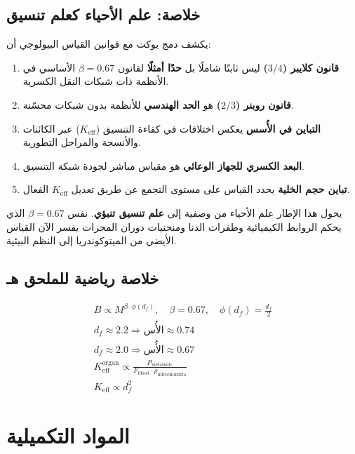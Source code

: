\documentclass[11pt,a4paper]{article}
\newcommand{\Keff}{K_{\mathrm{eff}}}
\begin{document}
	\subsection{خلاصة: علم الأحياء كعلم تنسيق}
	
	يكشف دمج يوكت مع قوانين القياس البيولوجي أن:
	\begin{enumerate}
		\item \textbf{قانون كلايبر (\(3/4\))} ليس ثابتًا شاملًا بل \textbf{حدًا أمثلًا} لقانون \(\beta = 0.67\) الأساسي في الأنظمة ذات شبكات النقل الكسرية.
		\item \textbf{قانون روبنر (\(2/3\))} هو \textbf{الحد الهندسي} للأنظمة بدون شبكات محسّنة.
		\item \textbf{التباين في الأُسس} يعكس اختلافات في كفاءة التنسيق (\(\Keff\)) عبر الكائنات والأنسجة والمراحل التطورية.
		\item \textbf{البعد الكسري للجهاز الوعائي} هو مقياس مباشر لجودة شبكة التنسيق.
		\item \textbf{تباين حجم الخلية} يحدد القياس على مستوى التجمع عن طريق تعديل \(\Keff\) الفعال.
	\end{enumerate}
	
	يحول هذا الإطار علم الأحياء من وصفية إلى \textbf{علم تنسيق تنبؤي}. نفس \(\beta = 0.67\) الذي يحكم الروابط الكيميائية وطفرات الدنا ومنحنيات دوران المجرات يفسر الآن القياس الأيضي من الميتوكوندريا إلى النظم البيئية.
	
	\subsection{خلاصة رياضية للملحق هـ}
	
	\begin{align}
		\boxed{B \propto M^{\beta \cdot \phi(d_f)},\quad \beta = 0.67,\quad \phi(d_f) = \frac{d_f}{2}} \\
		\boxed{d_f \approx 2.2 \Rightarrow \text{الأُس} \approx 0.74} \\
		\boxed{d_f \approx 2.0 \Rightarrow \text{الأُس} \approx 0.67} \\
		\boxed{\Keff^{\text{organ}} \propto \frac{P_{\text{metabolic}}}{F_{\text{blood}} \cdot \rho_{\text{mitochondria}}}} \\
		\boxed{\Keff \propto d_f^{2}}
	\end{align}
	
	\appendix
	\section{المواد التكميلية}
	
\end{document}

